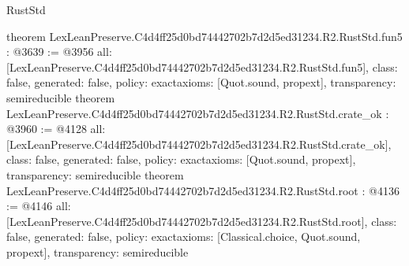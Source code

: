 \begin{lexlean}{RustStd}
\begin{coremodule}
{}
theorem LexLeanPreserve.C4d4ff25d0bd74442702b7d2d5ed31234.R2.RustStd.fun5 : @3639 := @3956 {
  all: [LexLeanPreserve.C4d4ff25d0bd74442702b7d2d5ed31234.R2.RustStd.fun5],
  class: false,
  generated: false,
  policy: exact{axioms: [Quot.sound, propext]},
  transparency: semireducible
}
theorem LexLeanPreserve.C4d4ff25d0bd74442702b7d2d5ed31234.R2.RustStd.crate_ok : @3960 := @4128 {
  all: [LexLeanPreserve.C4d4ff25d0bd74442702b7d2d5ed31234.R2.RustStd.crate_ok],
  class: false,
  generated: false,
  policy: exact{axioms: [Quot.sound, propext]},
  transparency: semireducible
}
theorem LexLeanPreserve.C4d4ff25d0bd74442702b7d2d5ed31234.R2.RustStd.root : @4136 := @4146 {
  all: [LexLeanPreserve.C4d4ff25d0bd74442702b7d2d5ed31234.R2.RustStd.root],
  class: false,
  generated: false,
  policy: exact{axioms: [Classical.choice, Quot.sound, propext]},
  transparency: semireducible
}


\end{coremodule}
\end{lexlean}
